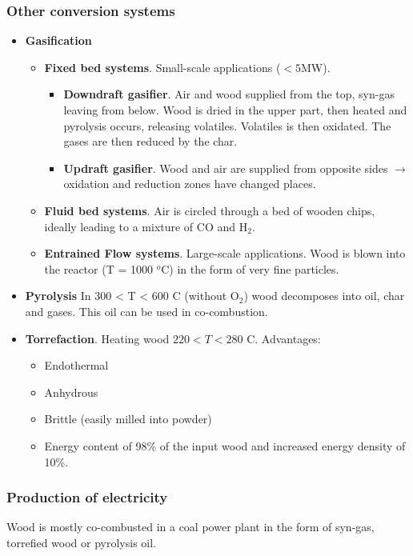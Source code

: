\documentclass[a4paper,10pt]{article}
\begin{document}
\subsubsection{Other conversion systems}
\begin{itemize}
 \item \textbf{Gasification}
 \begin{itemize}
 \item \textbf{Fixed bed systems}. Small-scale applications ($<5$MW). 
 \begin{itemize}
 \item \textbf{Downdraft gasifier}. Air and wood supplied from the top, syn-gas leaving from below. Wood is dried in the upper part, then heated and pyrolysis occurs, releasing volatiles. Volatiles is then oxidated. The gases are then reduced by the char. 
 \item \textbf{Updraft gasifier}. Wood and air are supplied from opposite sides $\rightarrow$ oxidation and reduction zones have changed places. 
 \end{itemize}
 \item \textbf{Fluid bed systems}. Air is circled through a bed of wooden chips, ideally leading to a mixture of CO and H$_2$. 
 \item \textbf{Entrained Flow systems}. Large-scale applications. Wood is blown into the reactor (T = 1000 $^o$C) in the form of very fine particles.
 \end{itemize}
 \item \textbf{Pyrolysis} In 300 < T < 600 C (without O$_2$) wood decomposes into oil, char and gases. This oil can be used in co-combustion.
 \item \textbf{Torrefaction}. Heating wood $220 < T < 280$ C. Advantages:
 \begin{itemize}
  \item Endothermal
  \item Anhydrous
  \item Brittle (easily milled into powder)
  \item Energy content of 98\% of the input wood and increased energy density of 10\%.
 \end{itemize}
\end{itemize}


\subsubsection{Production of electricity}
Wood is mostly co-combusted in a coal power plant in the form of syn-gas, torrefied wood or pyrolysis oil. 
\end{document}
